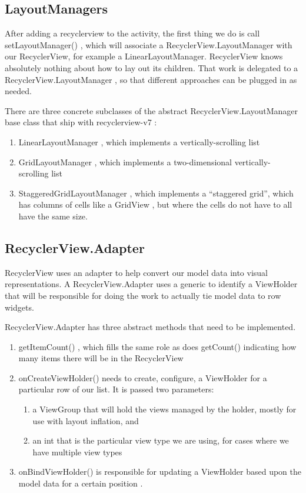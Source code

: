\subsection{LayoutManagers}
After adding a recyclerview to the activity, the first thing we do is call setLayoutManager() ,
which will associate a RecyclerView.LayoutManager with our RecyclerView, for example a LinearLayoutManager. RecyclerView
knows absolutely nothing about how to lay out its children. That work is delegated
to a RecyclerView.LayoutManager , so that different approaches can be plugged in as
needed.

There are three concrete subclasses of the abstract RecyclerView.LayoutManager
base class that ship with recyclerview-v7 :
\begin{enumerate}
	\item LinearLayoutManager , which implements a vertically-scrolling list
	\item GridLayoutManager ,
	which implements a two-dimensional vertically-
	scrolling list
	\item StaggeredGridLayoutManager , which implements a “staggered grid”, which
	has columns of cells like a GridView , but where the cells do not have to all
	have the same size.
\end{enumerate}







\subsection{RecyclerView.Adapter}
RecyclerView uses an adapter to help convert our model data
into visual representations. A RecyclerView.Adapter  uses a generic to
identify a ViewHolder that will be responsible for doing the work to actually tie
model data to row widgets.

RecyclerView.Adapter has three abstract methods that need to be implemented.

\begin{enumerate}
	\item getItemCount() , which fills the same role as does getCount() indicating how many items there will be in the RecyclerView
	\item onCreateViewHolder()  needs to create, configure,
	a ViewHolder for a particular row of our list. It is passed two parameters:
	\begin{enumerate}
		\item a ViewGroup that will hold the views managed by the holder, mostly for use
		with layout inflation, and
		\item an int that is the particular view type we are using, for cases where we have
		multiple view types
	\end{enumerate}
	\item onBindViewHolder()
	is responsible for updating a ViewHolder based upon the
model data for a certain position .
\end{enumerate}


